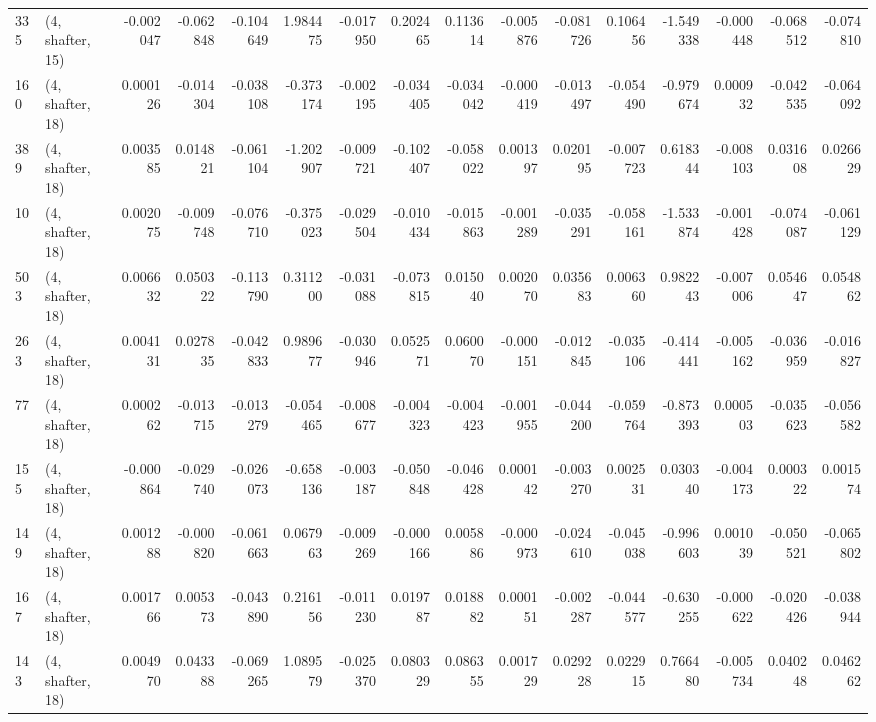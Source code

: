 \begin{tabular}{llrrrrrrrrrrrrrr}
335 &  (4, shafter, 15) &  -0.002047 & -0.062848 & -0.104649 &    1.984475 & -0.017950 &   0.202465 &  0.113614 & -0.005876 & -0.081726 &  0.106456 &   -1.549338 & -0.000448 & -0.068512 & -0.074810 \\
160 &  (4, shafter, 18) &   0.000126 & -0.014304 & -0.038108 &   -0.373174 & -0.002195 &  -0.034405 & -0.034042 & -0.000419 & -0.013497 & -0.054490 &   -0.979674 &  0.000932 & -0.042535 & -0.064092 \\
389 &  (4, shafter, 18) &   0.003585 &  0.014821 & -0.061104 &   -1.202907 & -0.009721 &  -0.102407 & -0.058022 &  0.001397 &  0.020195 & -0.007723 &    0.618344 & -0.008103 &  0.031608 &  0.026629 \\
10  &  (4, shafter, 18) &   0.002075 & -0.009748 & -0.076710 &   -0.375023 & -0.029504 &  -0.010434 & -0.015863 & -0.001289 & -0.035291 & -0.058161 &   -1.533874 & -0.001428 & -0.074087 & -0.061129 \\
503 &  (4, shafter, 18) &   0.006632 &  0.050322 & -0.113790 &    0.311200 & -0.031088 &  -0.073815 &  0.015040 &  0.002070 &  0.035683 &  0.006360 &    0.982243 & -0.007006 &  0.054647 &  0.054862 \\
263 &  (4, shafter, 18) &   0.004131 &  0.027835 & -0.042833 &    0.989677 & -0.030946 &   0.052571 &  0.060070 & -0.000151 & -0.012845 & -0.035106 &   -0.414441 & -0.005162 & -0.036959 & -0.016827 \\
77  &  (4, shafter, 18) &   0.000262 & -0.013715 & -0.013279 &   -0.054465 & -0.008677 &  -0.004323 & -0.004423 & -0.001955 & -0.044200 & -0.059764 &   -0.873393 &  0.000503 & -0.035623 & -0.056582 \\
155 &  (4, shafter, 18) &  -0.000864 & -0.029740 & -0.026073 &   -0.658136 & -0.003187 &  -0.050848 & -0.046428 &  0.000142 & -0.003270 &  0.002531 &    0.030340 & -0.004173 &  0.000322 &  0.001574 \\
149 &  (4, shafter, 18) &   0.001288 & -0.000820 & -0.061663 &    0.067963 & -0.009269 &  -0.000166 &  0.005886 & -0.000973 & -0.024610 & -0.045038 &   -0.996603 &  0.001039 & -0.050521 & -0.065802 \\
167 &  (4, shafter, 18) &   0.001766 &  0.005373 & -0.043890 &    0.216156 & -0.011230 &   0.019787 &  0.018882 &  0.000151 & -0.002287 & -0.044577 &   -0.630255 & -0.000622 & -0.020426 & -0.038944 \\
143 &  (4, shafter, 18) &   0.004970 &  0.043388 & -0.069265 &    1.089579 & -0.025370 &   0.080329 &  0.086355 &  0.001729 &  0.029228 &  0.022915 &    0.766480 & -0.005734 &  0.040248 &  0.046262 \\

\end{tabular}
